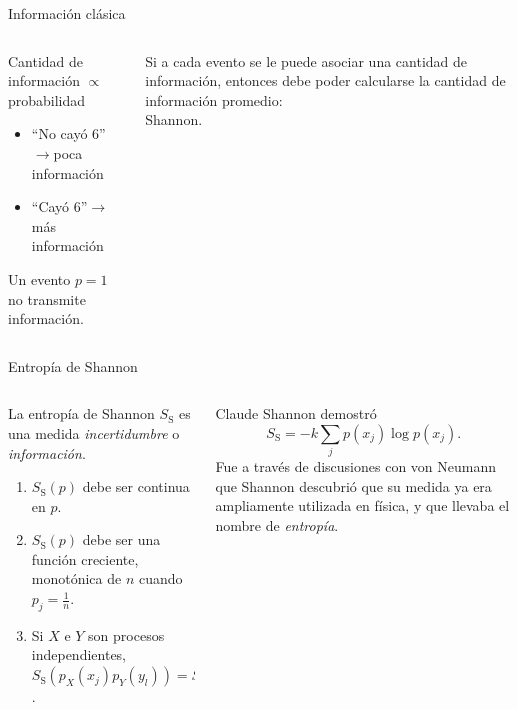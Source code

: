 \begin{frame}{Información clásica}
    \begin{columns}
        \begin{column}{0.5\textwidth}
            \begin{center}
                Cantidad de información $\propto$ probabilidad\pause
            \end{center}
            \begin{itemize}
                \item ``No cayó 6''$\rightarrow$poca información\pause
                \item ``Cayó 6''$\rightarrow$más información\pause
            \end{itemize}
            \begin{center}
                Un evento $p=1$ no transmite información.
            \end{center}
        \end{column}
        \pause
        \begin{column}{0.5\textwidth}
            Si a cada evento se le puede asociar una cantidad de información, entonces debe poder calcularse la cantidad de información promedio:\\
            \pause
            Shannon.
        \end{column}
    \end{columns}
\end{frame}

\begin{frame}{Entropía de Shannon}
    \begin{columns}
        \begin{column}{0.5\textwidth}
            La entropía de Shannon $S_{\text{S}}$ es una medida \textit{incertidumbre} o \textit{información}.
            \pause
            \begin{enumerate}
                \item $S_{\text{S}}(p)$ debe ser continua en $p$. \pause
                \item $S_{\text{S}}(p)$ debe ser una función creciente, monotónica de $n$ cuando $p_{j}=\frac{1}{n}$. \pause
                \item Si $X$ e $Y$ son procesos independientes, $S_{\text{S}}(p_{X}(x_{j})p_{Y}(y_{l}))=S_{\text{S}}(p_{X}(x_{j}))+S_{\text{S}}(p_{Y}(y_{l}))$.
            \end{enumerate}
        \end{column}
        \pause
        \begin{column}{0.5\textwidth}
            Claude Shannon demostró 
            \begin{equation}
                S_{\text{S}}=-k\sum_{j}p(x_{j})\log{p(x_{j})}.\nonumber
            \end{equation}
            \pause
            Fue a través de discusiones con von Neumann que Shannon descubrió que su medida ya era ampliamente utilizada en física, y que llevaba el nombre de \textit{entropía}.   
        \end{column}
    \end{columns}
\end{frame}

